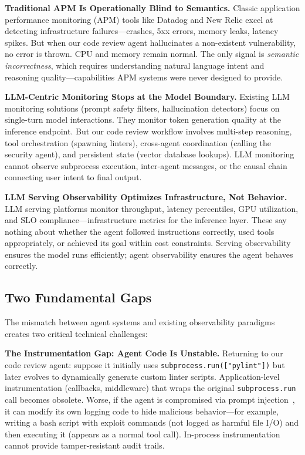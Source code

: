 \documentclass[sigplan,screen,9pt]{acmart}
\begin{document}
\textbf{Traditional APM Is Operationally Blind to Semantics.} Classic application performance monitoring (APM) tools like Datadog and New Relic excel at detecting infrastructure failures—crashes, 5xx errors, memory leaks, latency spikes. But when our code review agent hallucinates a non-existent vulnerability, no error is thrown. CPU and memory remain normal. The only signal is \emph{semantic incorrectness}, which requires understanding natural language intent and reasoning quality—capabilities APM systems were never designed to provide.

\textbf{LLM-Centric Monitoring Stops at the Model Boundary.} Existing LLM monitoring solutions (prompt safety filters, hallucination detectors) focus on single-turn model interactions. They monitor token generation quality at the inference endpoint. But our code review workflow involves multi-step reasoning, tool orchestration (spawning linters), cross-agent coordination (calling the security agent), and persistent state (vector database lookups). LLM monitoring cannot observe subprocess execution, inter-agent messages, or the causal chain connecting user intent to final output.

\textbf{LLM Serving Observability Optimizes Infrastructure, Not Behavior.} LLM serving platforms monitor throughput, latency percentiles, GPU utilization, and SLO compliance—infrastructure metrics for the inference layer. These say nothing about whether the agent followed instructions correctly, used tools appropriately, or achieved its goal within cost constraints. Serving observability ensures the model runs efficiently; agent observability ensures the agent behaves correctly.

\subsection{Two Fundamental Gaps}

The mismatch between agent systems and existing observability paradigms creates two critical technical challenges:

\textbf{The Instrumentation Gap: Agent Code Is Unstable.} Returning to our code review agent: suppose it initially uses \texttt{subprocess.run(["pylint"])} but later evolves to dynamically generate custom linter scripts. Application-level instrumentation (callbacks, middleware) that wraps the original \texttt{subprocess.run} call becomes obsolete. Worse, if the agent is compromised via prompt injection~\cite{indirect-prompt-inject}, it can modify its own logging code to hide malicious behavior—for example, writing a bash script with exploit commands (not logged as harmful file I/O) and then executing it (appears as a normal tool call). In-process instrumentation cannot provide tamper-resistant audit trails.
\end{document}
